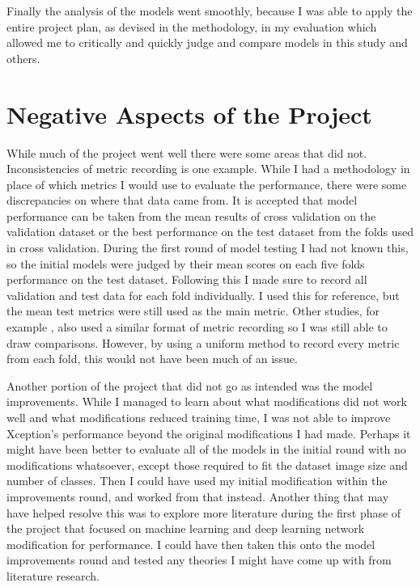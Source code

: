 Finally the analysis of the models went smoothly, because I was able to apply the entire project plan, as devised in the methodology, in my evaluation which allowed me to critically and quickly judge and compare models in this study and others.

\section{Negative Aspects of the Project}
While much of the project went well there were some areas that did not. Inconsistencies of metric recording is one example. While I had a methodology in place of which metrics I would use to evaluate the performance, there were some discrepancies on where that data came from. It is accepted that model performance can be taken from the mean results of cross validation on the validation dataset or the best performance on the test dataset from the folds used in cross validation. During the first round of model testing I had not known this, so the initial models were judged by their mean scores on each five folds performance on the test dataset. Following this I made sure to record all validation and test data for each fold individually. I used this for reference, but the mean test metrics were still used as the main metric. Other studies, for example \cite{bressem2020comparing}, also used a similar format of metric recording so I was still able to draw comparisons. However, by using a uniform method to record every metric from each fold, this would not have been much of an issue.

Another portion of the project that did not go as intended was the model improvements. While I managed to learn about what modifications did not work well and what modifications reduced training time, I was not able to improve Xception's performance beyond the original modifications I had made. Perhaps it might have been better to evaluate all of the models in the initial round with no modifications whatsoever, except those required to fit the dataset image size and number of classes. Then I could have used my initial modification within the improvements round, and worked from that instead. Another thing that may have helped resolve this was to explore more literature during the first phase of the project that focused on machine learning and deep learning network modification for performance. I could have then taken this onto the model improvements round and tested any theories I might have come up with from literature research.

